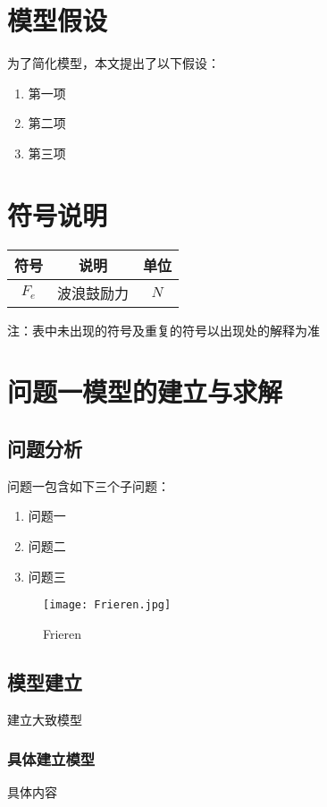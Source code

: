 \documentclass[12pt,a4paper]{article}
\begin{document}
\section{模型假设}
为了简化模型，本文提出了以下假设：
\begin{enumerate}[itemsep=-0.2em,topsep=0em]
  \item 第一项
  \item 第二项
  \item 第三项
\end{enumerate}

\section{符号说明}
\vspace{-1em}
\begin{table}[H]
  \centering
  \label{tab:符号说明} %
  \begin{tabular}{c c c} %
      \hline
      符号 & 说明 & 单位 \\ \hline
      $F_e$ & 波浪鼓励力 & $N$ \\ \hline
  \end{tabular}
\end{table}
注：表中未出现的符号及重复的符号以出现处的解释为准

\section{问题一模型的建立与求解}
\subsection{问题分析}
问题一包含如下三个子问题：
\begin{enumerate}[itemsep=-0.2em,topsep=0em]
  \item 问题一
  \item 问题二
  \item 问题三
\end{enumerate}
\begin{figure}[H]%
  \centering
  \texttt{[image: Frieren.jpg]}
  \caption{Frieren}
  \label{img:Frieren}    
\end{figure}

\subsection{模型建立}
建立大致模型
\subsubsection{具体建立模型}
具体内容
\end{document}
